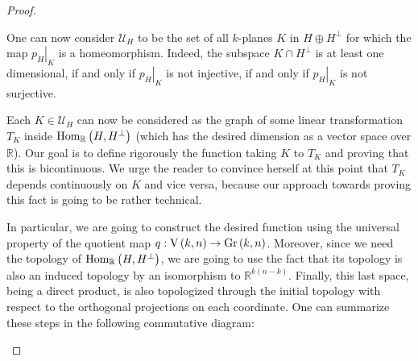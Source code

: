 \begin{proof}
\begin{b_item}
One can now consider $\mathcal{U}_H$ to be the set of all $k$-planes $K$ in $H\oplus H^{\perp}$ for which the map $\left.p_H\right|_{K}$ is a homeomorphism. Indeed, the subspace $K\cap H^{\perp}$ is at least one dimensional, if and only if $\left.p_H\right|_K$ is not injective, if and only if $\left.p_H\right|_K$ is not surjective.

Each $K\in\mathcal{U}_H$ can now be considered as the graph of some linear transformation $T_K$ inside $\mathrm{Hom}_{\mathbb{R}}\left(H,H^{\perp}\right)$ (which has the desired dimension as a vector space over $\mathbb{R}$). Our goal is to define rigorously the function taking $K$ to $T_K$ and proving that this is bicontinuous. We urge the reader to convince herself at this point that $T_K$ depends continuously on $K$ and vice versa, because our approach towards proving this fact is going to be rather technical.

In particular, we are going to construct the desired function using the universal property of the quotient map $q:\St{k}{n}\to\Gr{k}{n}$. Moreover, since we need the topology of $\mathrm{Hom}_{\mathbb{R}}\left(H,H^{\perp}\right)$, we are going to use the fact that its topology is also an induced topology by an isomorphism to $\mathbb{R}^{k(n-k)}$. Finally, this last space, being a direct product, is also topologized through the initial topology with respect to the orthogonal projections on each coordinate. One can summarize these steps in the following commutative diagram:

\begin{center}
\end{center}


\end{b_item}
\end{proof}
